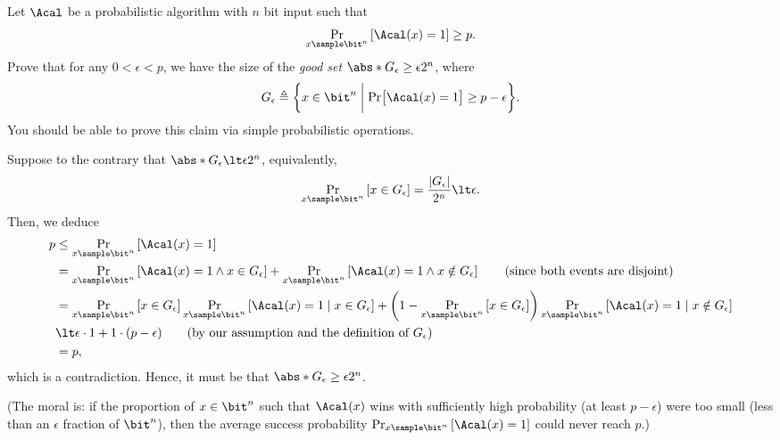 \begin{problem}[Markov]\label{p2}
    \leavevmode\par
    Let $\Acal$ be a probabilistic algorithm with $n$ bit input such that
    \[
        \Pr_{x\sample\bit^n}\left[\Acal(x)=1\right] \ge p.
    \]
    Prove that for any $0\lt \epsilon\lt p$, we have the size of the \textit{good set} $\abs*{G_\epsilon} \ge \epsilon 2^n$, where
    \[
        G_{\epsilon} \triangleq \biggl\{  x\in\bit^n \biggm\vert \Pr\bigl[\Acal(x)=1\bigr]\ge p-\epsilon \biggr\}.
    \]
    You should be able to prove this claim via simple probabilistic operations.
\end{problem}

\begin{answer}
    Suppose to the contrary that $\abs*{G_\epsilon} \lt \epsilon 2^n$, equivalently,
    \[
        \Pr_{x\sample\bit^n}\left[ x\in G_\epsilon \right] = \frac{|G_\epsilon|}{2^n}\lt \epsilon.
    \]
    Then, we deduce
    \begin{align*}
        p&\le \Pr_{x\sample\bit^n}\left[\Acal(x)=1\right]\\
        &= \Pr_{x\sample\bit^n}\left[\Acal(x)=1 \land x\in G_\epsilon\right] + \Pr_{x\sample\bit^n}\left[\Acal(x)=1 \land x\notin G_\epsilon\right]
        \qquad \textrm{(since both events are disjoint)}\\
        &= \Pr_{x\sample\bit^n}\left[ x\in G_\epsilon \right] \Pr_{x\sample\bit^n}\left[\Acal(x)=1 \mid x\in G_\epsilon\right] 
        + \left(1-\Pr_{x\sample\bit^n}\left[ x\in G_\epsilon \right]\right)\Pr_{x\sample\bit^n}\left[\Acal(x)=1 \mid x\notin G_\epsilon\right]\\
        &\lt \epsilon \cdot 1 + 1 \cdot (p-\epsilon) \qquad \textrm{(by our assumption and the definition of $G_\epsilon$)}\\
        &= p,
    \end{align*}
    which is a contradiction. Hence, it must be that $\abs*{G_\epsilon} \ge \epsilon 2^n$.

    (The moral is: if the proportion of $x\in  \bit^n$ such that $\Acal(x)$ wins with sufficiently high probability (at least $p-\epsilon$) were too small (less than an $\epsilon$ fraction of $\bit^n$), then the average success probability $\Pr_{x\sample\bit^n}\left[\Acal(x)=1\right]$ could never reach $p$.)
\end{answer}